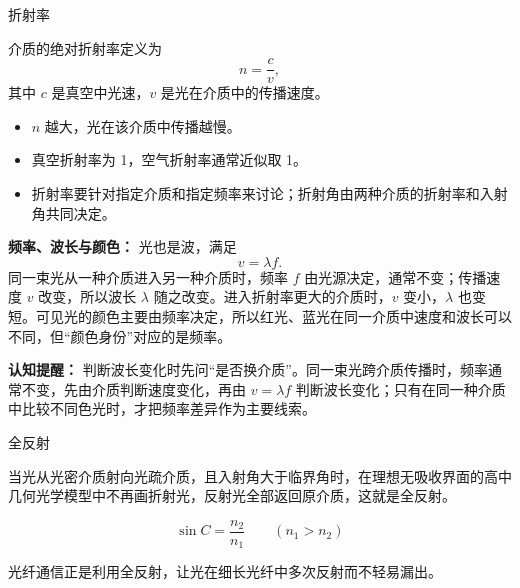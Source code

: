 \begin{conceptbox}{折射率}

介质的绝对折射率定义为
\[
\boxed{n=\frac{c}{v}},
\]
其中 $c$ 是真空中光速，$v$ 是光在介质中的传播速度。

\begin{itemize}
  \item $n$ 越大，光在该介质中传播越慢。
  \item 真空折射率为 1，空气折射率通常近似取 1。
  \item 折射率要针对指定介质和指定频率来讨论；折射角由两种介质的折射率和入射角共同决定。
\end{itemize}

\begin{center}


\label{fig:refraction-speed-wavefront}
\end{center}

\textbf{频率、波长与颜色：}
光也是波，满足
\[
v=\lambda f.
\]
同一束光从一种介质进入另一种介质时，频率 $f$ 由光源决定，通常不变；传播速度 $v$ 改变，所以波长 $\lambda$ 随之改变。进入折射率更大的介质时，$v$ 变小，$\lambda$ 也变短。可见光的颜色主要由频率决定，所以红光、蓝光在同一介质中速度和波长可以不同，但“颜色身份”对应的是频率。

\textbf{认知提醒：} 判断波长变化时先问“是否换介质”。同一束光跨介质传播时，频率通常不变，先由介质判断速度变化，再由 $v=\lambda f$ 判断波长变化；只有在同一种介质中比较不同色光时，才把频率差异作为主要线索。
\end{conceptbox}

\begin{conceptbox}{全反射}

当光从光密介质射向光疏介质，且入射角大于临界角时，在理想无吸收界面的高中几何光学模型中不再画折射光，反射光全部返回原介质，这就是全反射。

\[
\boxed{\sin C=\frac{n_2}{n_1}}\qquad(n_1>n_2)
\]

\begin{center}


\label{fig:total-internal-reflection}
\end{center}

光纤通信正是利用全反射，让光在细长光纤中多次反射而不轻易漏出。
\end{conceptbox}

